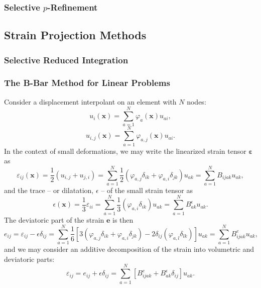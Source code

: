 \subsubsection{Selective $p$-Refinement}

\subsection{Strain Projection Methods}
\subsubsection{Selective Reduced Integration}
\subsubsection{The B-Bar Method for Linear Problems}

Consider a displacement interpolant on an element with $N$ nodes:
\begin{equation}
  u_i (\mathbf{x}) = \sum_{a = 1}^N \varphi_a (\mathbf{x}) u_{ai},
\end{equation}
\begin{equation}
  u_{i,j} (\mathbf{x}) = \sum_{a = 1}^N \varphi_{a,j} (\mathbf{x}) u_{ai}.
\end{equation}
In the context of small deformations, we may write the linearized strain tensor $\boldsymbol{\varepsilon}$ as
\begin{equation}
  \varepsilon_{ij} (\mathbf{x}) = \frac{1}{2} (u_{i,j} + u_{j,i}) = \sum_{a = 1}^N \frac{1}{2} (\varphi_{a,j} \delta_{ik} + \varphi_{a,i} \delta_{jk}) u_{ak} = \sum_{a = 1}^N B_{ijak} u_{ak},
\end{equation}
and the trace -- or dilatation, $\epsilon$ -- of the small strain tensor as
\begin{equation}
  \epsilon (\mathbf{x}) = \frac{1}{3} \varepsilon_{ii} = \sum_{a = 1}^N \frac{1}{3} (\varphi_{a,i} \delta_{ik}) u_{ak} = \sum_{a = 1}^N B^\epsilon_{ak} u_{ak}.
\end{equation}
The deviatoric part of the strain $\mathbf{e}$ is then
\begin{equation}
  e_{ij} = \varepsilon_{ij} - \epsilon \delta_{ij} = \sum_{a = 1}^N \frac{1}{6} \left[ 3(\varphi_{a,j} \delta_{ik} + \varphi_{a,i} \delta_{jk}) - 2 \delta_{ij} (\varphi_{a,l} \delta_{lk}) \right] u_{ak} = \sum_{a = 1}^N B^e_{ijak} u_{ak},
\end{equation}
and we may consider an additive decomposition of the strain into volumetric and deviatoric parts:
\begin{equation}
  \varepsilon_{ij} = e_{ij} + \epsilon \delta_{ij} = \sum_{a = 1}^N \left[ B^e_{ijak} + B^\epsilon_{ak} \delta_{ij} \right] u_{ak}.
\end{equation}

